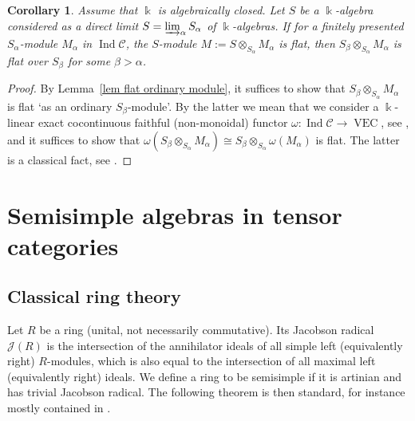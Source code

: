 \documentclass[11pt]{amsart}
\def\Ind{\operatorname{Ind}}
\def\JJ{\mathcal{J}}
\def\cC{\mathscr{C}}
\def\bk{\Bbbk}
\def\VEC{\operatorname{VEC}}
\newtheorem{cor}[thm]{Corollary}
\theoremstyle{definition}
\theoremstyle{remark}
\numberwithin{equation}{section}
\begin{document}
\begin{cor}\label{lem:Salpha}Assume that $\bk$ is algebraically closed.
    Let $S$ be a $\bk$-algebra considered as a direct limit $S=\varinjlim_\alpha S_\alpha$ of $\bk$-algebras. If for a finitely presented $S_\alpha$-module $M_\alpha$ in $\Ind\cC$, the $S$-module $M:=S\otimes_{S_\alpha}M_\alpha$ is flat, then $S_\beta\otimes_{S_\alpha}M_\alpha$ is flat over $S_\beta$ for some $\beta>\alpha$. 
\end{cor}
\begin{proof}
    By Lemma~\ref{lem flat ordinary module}, it suffices to show that $S_\beta\otimes_{S_\alpha}M_\alpha$ is flat `as an ordinary $S_\beta$-module'. By the latter we mean that we consider a $\bk$-linear exact cocontinuous faithful (non-monoidal) functor $\omega:\Ind\cC\to\VEC$, see \cite[Theorem~1.9.15]{EGNO}, and it suffices to show that $\omega(S_\beta\otimes_{S_\alpha}M_\alpha)\cong S_\beta\otimes_{S_\alpha}\omega(M_\alpha)$ is flat.  The latter is a classical fact, see \cite[11.2.6.1(ii)]{EGA}.
\end{proof}




\section{Semisimple algebras in tensor categories}\label{sec:genstuff}

\subsection{Classical ring theory}

Let $R$ be a ring (unital, not necessarily commutative). Its Jacobson radical $\JJ(R)$ is the intersection of the annihilator ideals of all simple left (equivalently right) $R$-modules, which is also equal to the intersection of all maximal left (equivalently right) ideals. We define a ring to be semisimple if it is artinian and has trivial Jacobson radical. The following theorem is then standard, for instance mostly contained in \cite{Lam}.
\end{document}
